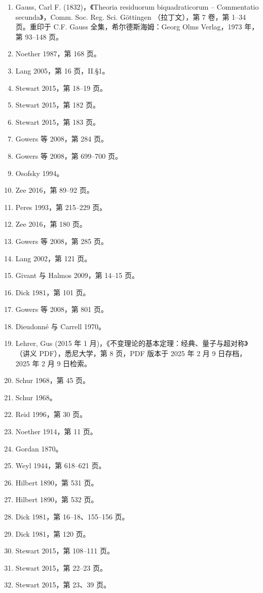 \begin{enumerate}
\item Gauss, Carl F. (1832)，《Theoria residuorum biquadraticorum – Commentatio secunda》，Comm. Soc. Reg. Sci. Göttingen （拉丁文），第 7 卷，第 1–34 页。重印于 C.F. Gauss 全集，希尔德斯海姆：Georg Olms Verlag，1973 年，第 93–148 页。
\item Noether 1987，第 168 页。
\item Lang 2005，第 16 页，II.§1。
\item Stewart 2015，第 18–19 页。
\item Stewart 2015，第 182 页。
\item Stewart 2015，第 183 页。
\item Gowers 等 2008，第 284 页。
\item Gowers 等 2008，第 699–700 页。
\item Osofsky 1994。
\item Zee 2016，第 89–92 页。
\item Peres 1993，第 215–229 页。
\item Zee 2016，第 180 页。
\item Gowers 等 2008，第 285 页。
\item Lang 2002，第 121 页。
\item Givant 与 Halmos 2009，第 14–15 页。
\item Dick 1981，第 101 页。
\item Gowers 等 2008，第 801 页。
\item Dieudonné 与 Carrell 1970。
\item Lehrer, Gus (2015 年 1 月)，《不变理论的基本定理：经典、量子与超对称》（讲义 PDF），悉尼大学，第 8 页，PDF 版本于 2025 年 2 月 9 日存档，2025 年 2 月 9 日检索。
\item Schur 1968，第 45 页。
\item Schur 1968。
\item Reid 1996，第 30 页。
\item Noether 1914，第 11 页。
\item Gordan 1870。
\item Weyl 1944，第 618–621 页。
\item Hilbert 1890，第 531 页。
\item Hilbert 1890，第 532 页。
\item Dick 1981，第 16–18、155–156 页。
\item Dick 1981，第 120 页。
\item Stewart 2015，第 108–111 页。
\item Stewart 2015，第 22–23 页。
\item Stewart 2015，第 23、39 页。

\end{enumerate}
